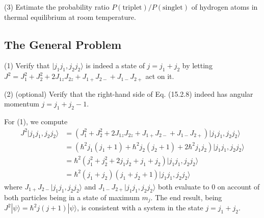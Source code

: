 \documentclass[../principles-of-quantum-mechanics.tex]{subfiles}
\begin{document}
\begin{questions}
		(3) Estimate the probability ratio $P(\text{triplet})/P(\text{singlet})$ of hydrogen atoms in thermal equilibrium at room temperature.

		\setcounter{subsection}{1}
		\setcounter{question}{0}
		\subsection{The General Problem}
		
		\question (1) Verify that $|j_1j_1, j_2j_2\rangle$ is indeed a state of $j = j_1 + j_2$ by letting $J^2 = J_1^2 + J_2^2 + 2J_{1z}J_{2z} + J_{1+}J_{2-} + J_{1-}J_{2+}$ act on it.
		
		(2) (optional) Verify that the right-hand side of Eq. (15.2.8) indeed has angular momentum $j = j_1 + j_2 - 1$.
		
		\begin{solution}
			For (1), we compute
			\begin{align*}
				J^2|j_1j_1, j_2j_2\rangle &= (J_1^2 + J_2^2 + 2J_{1z}J_{2z} + J_{1+}J_{2-} + J_{1-}J_{2+})|j_1j_1, j_2j_2\rangle \\
				&= (\hbar^2j_1(j_1 + 1) + \hbar^2j_2(j_2 + 1) + 2\hbar^2j_1j_2)|j_1j_1, j_2j_2\rangle \\
				&= \hbar^2(j_1^2 + j_2^2 + 2j_1j_2 + j_1 + j_2)|j_1j_1, j_2j_2\rangle \\
				&= \hbar^2(j_1 + j_2)(j_1 + j_2 + 1)|j_1j_1, j_2j_2\rangle
			\end{align*}
			where $J_{1+}J_{2-}|j_1j_1, j_2j_2\rangle$ and $J_{1-}J_{2+}|j_1j_1, j_2j_2\rangle$ both evaluate to $0$ on account of both particles being in a state of maximum $m_j$. The end result, being $J^2|\psi\rangle = \hbar^2 j(j + 1)|\psi\rangle$, is consistent with a system in the state $j = j_1 + j_2$.
			

\end{solution}
\end{questions}
\end{document}
